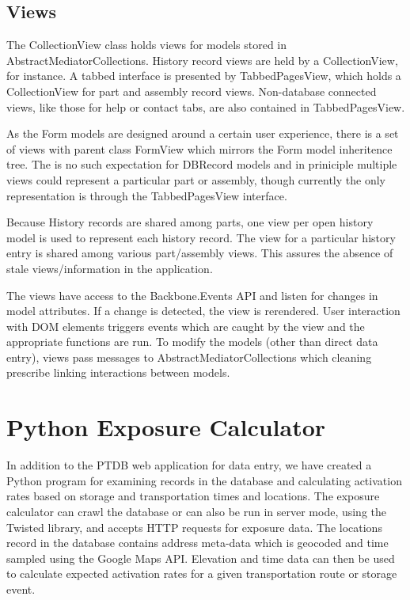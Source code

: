 \documentclass[journal]{IEEEtran}
\begin{document}
\subsection{Views}

The CollectionView class holds views for models stored in AbstractMediatorCollections. History record 
views are held by a CollectionView, for instance. A tabbed interface is presented by TabbedPagesView,
which holds a CollectionView for part and assembly record views. Non-database connected views, like those
for help or contact tabs, are also contained in TabbedPagesView.

As the Form models are designed around a certain user experience, there is a set of views with parent class
FormView which mirrors the Form model inheritence tree. The is no such expectation for DBRecord models and
in priniciple multiple views could represent a particular part or assembly, though currently the only representation is
through the TabbedPagesView interface.

Because History records are shared among parts, one view per open history model is used to represent each history
record. The view for a particular history entry is shared among various part/assembly views. This assures the absence of
stale views/information in the application.

The views have access to the Backbone.Events API and listen for changes in model attributes. If a change is detected,
the view is rerendered. User interaction with DOM elements triggers events which are caught by the view and the appropriate
functions are run. To modify the models (other than direct data entry), views pass messages to AbstractMediatorCollections
which cleaning prescribe linking interactions between models.

\section{Python Exposure Calculator}

In addition to the PTDB web application for data entry, we have created a Python program for
examining records in the database and calculating activation rates based on storage and 
transportation times and locations. The exposure calculator can crawl the database or can
also be run in server mode, using the Twisted library, and accepts HTTP requests for
exposure data. The locations record in the database contains address meta-data which
is geocoded and time sampled using the Google Maps API. Elevation and time data can
then be used to calculate expected activation rates for a given transportation route
or storage event.
\end{document}
